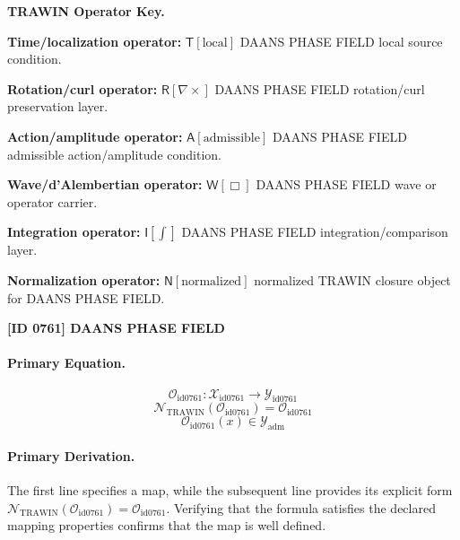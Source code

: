 \par\vspace{0.45\baselineskip}
\noindent\begin{minipage}[t]{\linewidth}
\begingroup
\small
\raggedright
\textbf{TRAWIN Operator Key.}\par
\noindent\textbf{Time/localization operator:} $\mathsf{T}\!\left[\mathrm{local}\right]$ DAANS PHASE FIELD local source condition.\par
\noindent\textbf{Rotation/curl operator:} $\mathsf{R}\!\left[\nabla\times\right]$ DAANS PHASE FIELD rotation/curl preservation layer.\par
\noindent\textbf{Action/amplitude operator:} $\mathsf{A}\!\left[\mathrm{admissible}\right]$ DAANS PHASE FIELD admissible action/amplitude condition.\par
\noindent\textbf{Wave/d'Alembertian operator:} $\mathsf{W}\!\left[\Box\right]$ DAANS PHASE FIELD wave or operator carrier.\par
\noindent\textbf{Integration operator:} $\mathsf{I}\!\left[\int\right]$ DAANS PHASE FIELD integration/comparison layer.\par
\noindent\textbf{Normalization operator:} $\mathsf{N}\!\left[\mathrm{normalized}\right]$ normalized TRAWIN closure object for DAANS PHASE FIELD.\par
\endgroup
\end{minipage}

\clearpage
\noindent\textbf{[ID 0761] DAANS PHASE FIELD}\par
\vspace{0.35em}
\paragraph{Primary Equation.}
\[
\mathcal{O}_{\mathrm{id0761}}:\mathcal{X}_{\mathrm{id0761}}\longrightarrow\mathcal{Y}_{\mathrm{id0761}}
\]
\[
\mathcal{N}_{\mathrm{TRAWIN}}(\mathcal{O}_{\mathrm{id0761}})=\mathcal{O}_{\mathrm{id0761}}
\]
\[
\mathcal{O}_{\mathrm{id0761}}(x)\in\mathcal{Y}_{\mathrm{adm}}
\]

\paragraph{Primary Derivation.}
The first line specifies a map, while the subsequent line provides its explicit form \( \mathcal{N}_{\mathrm{TRAWIN}}(\mathcal{O}_{\mathrm{id0761}})=\mathcal{O}_{\mathrm{id0761}} \). Verifying that the formula satisfies the declared mapping properties confirms that the map is well defined.

